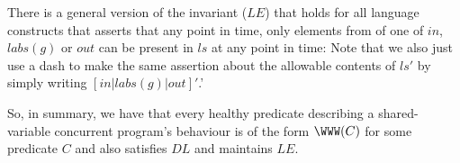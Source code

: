 There is a general version of the invariant ($LE$) that holds
for all language constructs that asserts that any point in time,
only elements from of one of $in$, $labs(g)$ or $out$
can be present in $ls$ at any point in time:
Note that we also just use a dash to make
the same assertion about the allowable contents of $ls'$
by simply writing $[in|labs(g)|out]'$.'

So, in summary, we have that every healthy predicate describing
a shared-variable concurrent program's behaviour is of the form $\WWW(C)$
for some predicate $C$ and also satisfies $DL$ and maintains $LE$.
